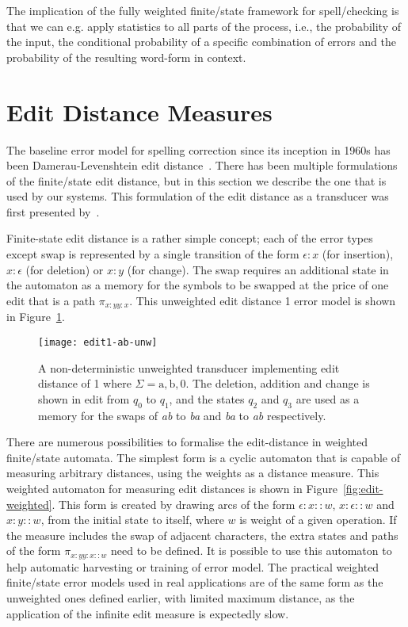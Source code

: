 \documentclass[officiallayout]{unihelcompling}
\begin{document}
The implication of the fully weighted finite\-/state framework for
spell\-/checking is that we can e.g. apply statistics to all parts of the
process, i.e., the probability of the input, the conditional probability of a
specific combination of errors and the probability of the resulting word-form
in context. 

\section{Edit Distance Measures}
\label{sec:edit-distance}

The baseline error model for spelling correction since its inception in 1960s
has been Damerau-Levenshtein edit
distance~\citep{damerau1964technique,levenshtein1966binary}. There has been
multiple formulations of the finite\-/state edit distance, but in this section
we describe the one that is used by our systems. This formulation of the edit
distance as a transducer was first presented
by~\citet{schulz2002fast}.

Finite-state edit distance is a rather simple concept; each of the error types
except swap is represented by a single transition of the form $\epsilon:x$ (for
insertion), $x:\epsilon$ (for deletion) or $x:y$ (for change). The swap
requires an additional state in the automaton as a memory for the symbols to be
swapped at the price of one edit that is a path $\pi_{x:y y:x}$. This
unweighted edit distance 1 error model is shown in Figure~\ref{fig:edit1-ab}.

\begin{figure}
    \texttt{[image: edit1-ab-unw]}
    \caption{A non-deterministic unweighted transducer implementing
        edit distance of 1 where $\Sigma = {\mathrm{a}, \mathrm{b}, 0}$.
        The deletion, addition and change is shown in
        edit from $q_0$ to $q_1$, and the states $q_2$ and $q_3$ are used as a
        memory for the swaps of \emph{ab} to \emph{ba} and \emph{ba} to
        \emph{ab} respectively.  \label{fig:edit1-ab}}
\end{figure}

There are numerous possibilities to formalise the edit-distance in weighted
finite\-/state automata. The simplest form is a cyclic automaton that is
capable of measuring arbitrary distances, using the weights as a distance
measure. This weighted automaton for measuring edit distances is shown in
Figure~\ref{fig:edit-weighted}. This form is created by drawing arcs of the
form $\epsilon:x::w$, $x:\epsilon::w$ and $x:y::w$, from the initial state to
itself, where $w$ is weight of a given operation. If the measure includes the
swap of adjacent characters, the extra states and paths of the form $\pi_{x:y
y:x::w}$ need to be defined. It is possible to use this automaton to help
automatic harvesting or training of error model. The practical weighted
finite\-/state error models used in real applications are of the same form as
the unweighted ones defined earlier, with limited maximum distance, as the
application of the infinite edit measure is expectedly slow.
\end{document}
